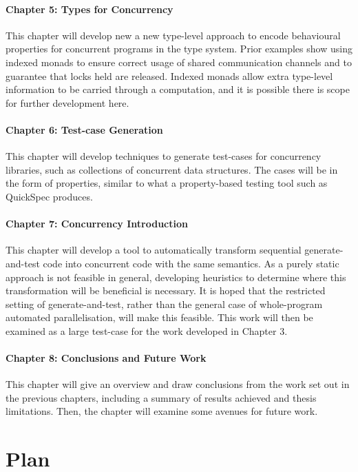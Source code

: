 \documentclass{article}
\begin{document}
\paragraph{Chapter 5: Types for Concurrency} This chapter will develop
new a new type-level approach to encode behavioural properties for
concurrent programs in the type system. Prior examples show using
indexed monads to ensure correct usage of shared communication
channels\cite{pucella2008} and to guarantee that locks held are
released\cite{kiselyov2010}. Indexed monads allow extra type-level
information to be carried through a computation, and it is possible
there is scope for further development here.

\paragraph{Chapter 6: Test-case Generation} This chapter will develop
techniques to generate test-cases for concurrency libraries, such as
collections of concurrent data structures. The cases will be in the
form of properties, similar to what a property-based testing tool such
as QuickSpec\cite{claessen2010} produces.

\paragraph{Chapter 7: Concurrency Introduction} This chapter will
develop a tool to automatically transform sequential generate-and-test
code into concurrent code with the same semantics. As a purely static
approach is not feasible in general\cite{calderon2015}, developing
heuristics to determine where this transformation will be beneficial
is necessary. It is hoped that the restricted setting of
generate-and-test, rather than the general case of whole-program
automated parallelisation, will make this feasible. This work will
then be examined as a large test-case for the work developed in
Chapter 3.

\paragraph{Chapter 8: Conclusions and Future Work} This chapter will
give an overview and draw conclusions from the work set out in the
previous chapters, including a summary of results achieved and thesis
limitations. Then, the chapter will examine some avenues for future
work.

\section{Plan}
\end{document}
